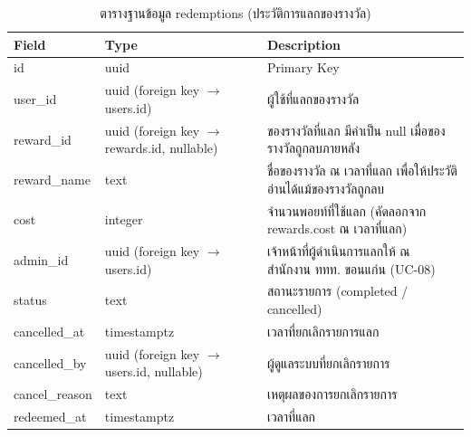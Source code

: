\begin{table}[H]
\centering
\caption{ตารางฐานข้อมูล redemptions (ประวัติการแลกของรางวัล)}
\label{tab:db_redemptions}
\begin{tabular}{|p{3.6cm}|p{2.6cm}|p{6.8cm}|}
\hline
\textbf{Field} & \textbf{Type} & \textbf{Description} \\
\hline
id & uuid & Primary Key \\ \hline
user\_id & uuid (foreign key $\to$ users.id) & ผู้ใช้ที่แลกของรางวัล \\ \hline
reward\_id & uuid (foreign key $\to$ rewards.id, nullable) & ของรางวัลที่แลก มีค่าเป็น null เมื่อของรางวัลถูกลบภายหลัง \\ \hline
reward\_name & text & ชื่อของรางวัล ณ เวลาที่แลก เพื่อให้ประวัติอ่านได้แม้ของรางวัลถูกลบ \\ \hline
cost & integer & จำนวนพอยท์ที่ใช้แลก (คัดลอกจาก rewards.cost ณ เวลาที่แลก) \\ \hline
admin\_id & uuid (foreign key $\to$ users.id) & เจ้าหน้าที่ผู้ดำเนินการแลกให้ ณ สำนักงาน ททท. ขอนแก่น (UC-08) \\ \hline
status & text & สถานะรายการ (completed / cancelled) \\ \hline
cancelled\_at & timestamptz & เวลาที่ยกเลิกรายการแลก \\ \hline
cancelled\_by & uuid (foreign key $\to$ users.id, nullable) & ผู้ดูแลระบบที่ยกเลิกรายการ \\ \hline
cancel\_reason & text & เหตุผลของการยกเลิกรายการ \\ \hline
redeemed\_at & timestamptz & เวลาที่แลก \\
\hline
\end{tabular}
\end{table}

